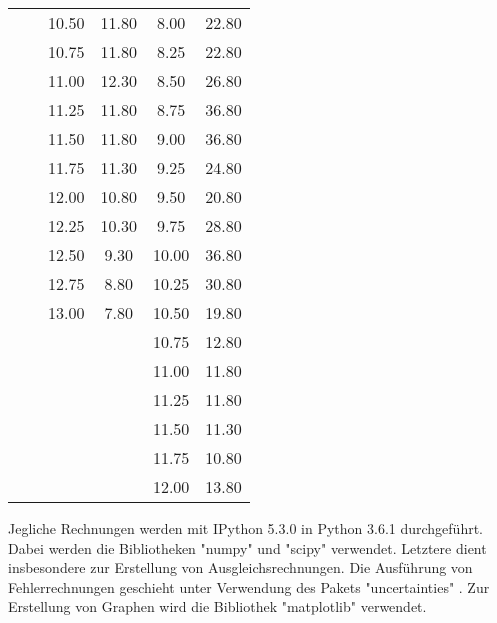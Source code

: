 \begin{longtable}{S[table-format=3.2] S[table-format=3.2] S[table-format=3.2] S[table-format=3.2] S[table-format=3.2] S[table-format=3.2]}
                     &     & 10.50 & 11.80 & 8.00 & 22.80\\
                     &     & 10.75 & 11.80 & 8.25 & 22.80\\
                     &     & 11.00 & 12.30 & 8.50 & 26.80\\
                     &     & 11.25 & 11.80 & 8.75 & 36.80\\
                     &     & 11.50 & 11.80 & 9.00 & 36.80\\
                     &     & 11.75 & 11.30 & 9.25 & 24.80\\
                     &     & 12.00 & 10.80 & 9.50 & 20.80\\
                     &     & 12.25 & 10.30 & 9.75 & 28.80\\
                     &     & 12.50 & 9.30 & 10.00 & 36.80\\
                     &     & 12.75 & 8.80 & 10.25 & 30.80\\
                     &     & 13.00 & 7.80 & 10.50 & 19.80\\
                     &     &    &  & 10.75 & 12.80\\
                     &     &    &  & 11.00 & 11.80\\
                     &     &    &  & 11.25 & 11.80\\
                     &     &    &  & 11.50 & 11.30\\
                     &     &    &  & 11.75 & 10.80\\
                     &     &    &  & 12.00 & 13.80\\
                \bottomrule
\end{longtable}

Jegliche Rechnungen werden mit IPython 5.3.0 in Python 3.6.1 durchgeführt. Dabei
werden die Bibliotheken "numpy" \cite{numpy} und "scipy" \cite{scipy} verwendet.
Letztere dient insbesondere zur Erstellung von Ausgleichsrechnungen.
Die Ausführung von Fehlerrechnungen geschieht unter Verwendung des Pakets
"uncertainties" \cite{uncertainties}. Zur Erstellung von Graphen wird die Bibliothek
"matplotlib" \cite{matplotlib} verwendet.

